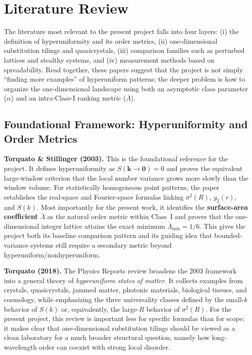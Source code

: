 \documentclass[11pt,letterpaper]{article}
\begin{document}
\section{Literature Review}

\noindent The literature most relevant to the present project falls into four layers:
(i) the definition of hyperuniformity and its order metrics, (ii) one-dimensional
substitution tilings and quasicrystals, (iii) comparison families such as perturbed
lattices and stealthy systems, and (iv) measurement methods based on spreadability.
Read together, these papers suggest that the project is not simply ``finding more
examples'' of hyperuniform patterns; the deeper problem is how to organize the
one-dimensional landscape using both an asymptotic class parameter ($\alpha$) and an
intra-Class-I ranking metric ($\bar\Lambda$).

\subsection{Foundational Framework: Hyperuniformity and Order Metrics}

\noindent\textbf{Torquato \& Stillinger (2003).}
This is the foundational reference for the project. It defines hyperuniformity as
$S(\mathbf{k}\to\mathbf{0}) = 0$ and proves the equivalent large-window criterion that
the local number variance grows more slowly than the window volume.
For statistically homogeneous point patterns, the paper establishes the real-space and
Fourier-space formulas linking $\sigma^2(R)$, $g_2(r)$, and $S(k)$.
Most importantly for the present work, it identifies the \textbf{surface-area
coefficient} $\bar\Lambda$ as the natural order metric within Class~I and proves that
the one-dimensional integer lattice attains the exact minimum
$\bar\Lambda_{\min} = 1/6$.
This gives the project both its baseline comparison pattern and its guiding idea that
bounded-variance systems still require a secondary metric beyond hyperuniform/nonhyperuniform.

\vspace{0.4em}
\noindent\textbf{Torquato (2018).}
The Physics Reports review broadens the 2003 framework into a general theory of
\emph{hyperuniform states of matter}.
It collects examples from crystals, quasicrystals, jammed matter, photonic materials,
biological tissues, and cosmology, while emphasizing the three universality classes
defined by the small-$k$ behavior of $S(k)$ or, equivalently, the large-$R$ behavior of
$\sigma^2(R)$.
For the present project, this review is important less for specific formulas than for
scope: it makes clear that one-dimensional substitution tilings should be viewed as a
clean laboratory for a much broader structural question, namely how long-wavelength
order can coexist with strong local disorder.
\end{document}
